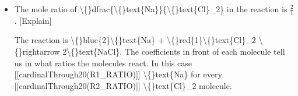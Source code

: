 \documentclass{article}
\begin{document}
\begin{itemize}
            [Explain]
            
                
                    We want to convert the given amount of \textbackslash\{\}text\{Cl\}\_2 from grams to moles. To do this, we divide
                    the given amount of \textbackslash\{\}text\{Cl\}\_2 by the molar mass of \textbackslash\{\}text\{Cl\}\_2.
                
                     \textbackslash\{\}dfrac\{\textbackslash\{\}text\{grams of \}\textbackslash\{\}text\{Cl\}\_2\}\{\textbackslash\{\}text\{molar mass of \}\textbackslash\{\}text\{Cl\}\_2\} = \textbackslash\{\}text\{moles of \}\textbackslash\{\}text\{Cl\}\_2
                
                    To find the molar mass of \textbackslash\{\}text\{Cl\}\_2, we look up the atomic weight of each atom in a molecule of
                    \textbackslash\{\}text\{Cl\}\_2 in the periodic table and add them together.
                    In this case, it's [[roundTo(3, molarMass("Cl") * 2)]] \textbackslash\{\}text\{g/mol\}.
                
                    Dividing the given [[randRange(1, 40 * (R2\_RATIO * R2\_MOLAR\_MASS) / (R1\_RATIO * R1\_MOLAR\_MASS))]] \textbackslash\{\}text\{g\} of \textbackslash\{\}text\{Cl\}\_2 by the molar mass of
                    [[roundTo(3, molarMass("Cl") * 2)]] \textbackslash\{\}text\{g/mol\} tells us we're starting with
                    \textbackslash\{\}text\{ [[roundTo(3, R2\_MASS / R2\_MOLAR\_MASS)]] [[plural\_form(MOLE, R2\_MOL)]]\} \textbackslash\{\}text\{ of \}\textbackslash\{\}text\{Cl\}\_2.
  \item The mole ratio of \textbackslash\{\}dfrac\{\textbackslash\{\}text\{Na\}\}\{\textbackslash\{\}text\{Cl\}\_2\} in the reaction is
                    $\frac{2}{1}$.
                    [Explain]
                
                
                    
                        The reaction is \textbackslash\{\}blue\{2\}\textbackslash\{\}text\{Na\} +
                        \textbackslash\{\}red\{1\}\textbackslash\{\}text\{Cl\}\_2 \textbackslash\{\}rightarrow
                        2\textbackslash\{\}text\{NaCl\}.
                        The coefficients in front of each molecule tell us in what ratios the molecules react. In this case
                        [[cardinalThrough20(R1\_RATIO)]] \textbackslash\{\}text\{Na\} for every
                        [[cardinalThrough20(R2\_RATIO)]] \textbackslash\{\}text\{Cl\}\_2 molecule.
                    

\end{itemize}
\end{document}
